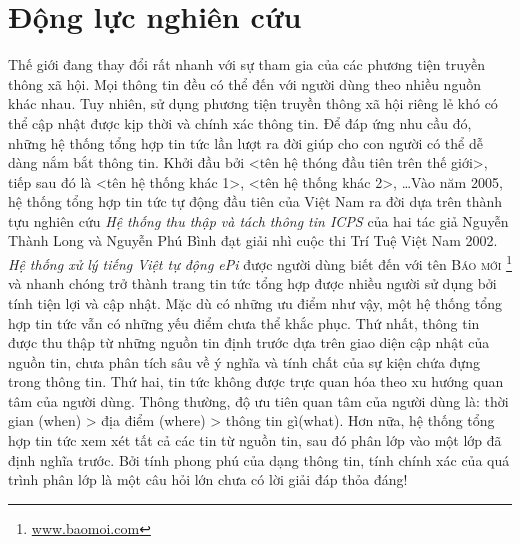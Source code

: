 \section{Động lực nghiên cứu}
\label{motivation}
\noindent \noindent Thế giới đang thay đổi rất nhanh  với sự tham gia của các phương tiện truyền thông xã hội. Mọi thông tin đều có thể đến với người dùng theo nhiều nguồn khác nhau. Tuy nhiên, sử dụng phương tiện truyền thông xã hội riêng lẻ khó có thể cập nhật được kịp thời và chính xác thông tin. Để đáp ứng nhu cầu đó, những hệ thống tổng hợp tin tức lần lượt ra đời giúp cho con người có thể dễ dàng nắm bắt thông tin. Khởi đầu bởi <tên hệ thóng đầu tiên trên thế giới>, tiếp sau đó là  <tên hệ thống khác 1>, <tên hệ thống khác 2>, \ldots Vào năm 2005, hệ thống tổng hợp tin tức tự động đầu tiên của Việt Nam ra đời dựa trên thành tựu nghiên cứu \emph{Hệ thống thu thập và tách thông tin ICPS} của hai tác giả Nguyễn Thành Long và Nguyễn Phú Bình đạt giải nhì cuộc thi Trí Tuệ Việt Nam 2002. \emph{Hệ thống xử lý tiếng Việt tự động ePi}  được người dùng biết đến với tên \textsc{Báo mới} \footnote{\href{www.baomoi.com}{www.baomoi.com}} và nhanh chóng trở thành trang tin tức tổng hợp được nhiều người sử dụng bởi tính tiện lợi và cập nhật. Mặc dù có những ưu điểm như vậy, một hệ thống tổng hợp tin tức vẫn có những yếu điểm chưa thể khắc phục. Thứ nhất, thông tin được thu thập từ những nguồn tin định trước dựa trên giao diện cập nhật của nguồn tin, chưa phân tích sâu về ý nghĩa và tính chất của sự kiện chứa đựng trong thông tin. Thứ hai, tin tức không được trực quan hóa theo xu hướng quan tâm của người dùng. Thông thường, độ ưu tiên quan tâm của người dùng là: thời gian (when) > địa điểm (where) >  thông tin gì(what). Hơn nữa, hệ thống tổng hợp tin tức xem xét tất cả các tin từ nguồn tin, sau đó phân lớp vào một lớp đã định nghĩa trước. Bởi tính phong phú của dạng thông tin, tính chính xác của quá trình phân lớp là một câu hỏi lớn chưa có lời giải đáp thỏa đáng! \\
